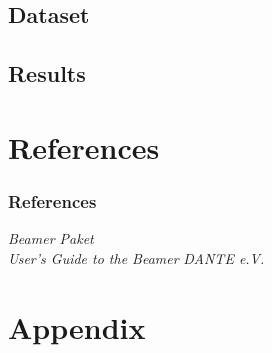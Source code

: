\documentclass{beamer}
\theoremstyle{plain}
\theoremstyle{definition}
\begin{document}
\subsection{Dataset}
\subsection{Results}


\section{References}
\begin{frame}

\frametitle{References}

\begin{thebibliography}{9}
 \emph{Beamer Paket} \\ 
 \emph{User's Guide to the Beamer} 
 \emph{DANTE e.V.}    
\end{thebibliography}


\end{frame}


\section{Appendix}
\end{document}
